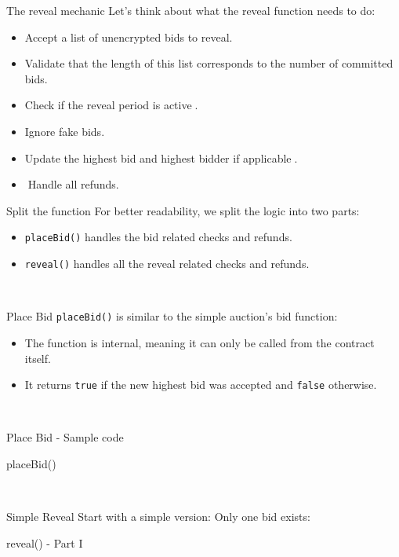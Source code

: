 \documentclass[]{beamer}
\begin{document}
\begin{frame}{The reveal mechanic}
	Let's think about what the reveal function needs to do:
	\begin{itemize}
		\item<2-> Accept a list of unencrypted bids to reveal.
		\item<3-> Validate that the length of this list corresponds to the number of committed bids.
		\item<4-> Check if the reveal period is active.
		\item<5-> Ignore fake bids.
		\item<6-> Update the highest bid and highest bidder if applicable.
		\item<7-> Handle all refunds.
	\end{itemize}
\end{frame}

\begin{frame}{Split the function}
For better readability, we split the logic into two parts:
	\begin{itemize}
		\item<2-> \texttt{placeBid()} handles the bid related checks and refunds.
		\item<3-> \texttt{reveal()} handles all the reveal related checks and refunds.
	\end{itemize}
\end{frame}

%
\begin{frame}{Place Bid}
\texttt{placeBid()} is similar to the simple auction's bid function:
	\begin{itemize}
		\item<2-> The function is internal, meaning it can only be called from the contract itself.
		\item<3-> It returns \texttt{true} if the new highest bid was accepted and \texttt{false} otherwise.
	\end{itemize} 	
\end{frame}

%
\begin{frame}{Place Bid - Sample code}
	\begin{samplecode}{placeBid()}
		
	\end{samplecode}
\end{frame}
%

\begin{frame}{Simple Reveal}
Start with a simple version: Only one bid exists:
\vspace{.3cm}
	\begin{samplecode}{reveal() - Part I}
		
	\end{samplecode}
\end{frame}
\end{document}
